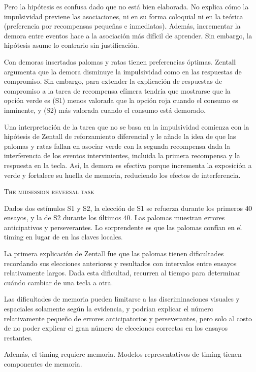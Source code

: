 \documentclass[a4paper,12pt]{article}
\begin{document}
Pero la hipótesis es confusa dado que no está bien elaborada. No explica cómo la impulsividad previene las asociaciones, ni en su forma coloquial ni en la teórica (preferencia por recompensas pequeñas e inmediatas). Además, incrementar la demora entre eventos hace a la asociación más difícil de aprender. Sin embargo, la hipótesis asume lo contrario sin justificación. 

Con demoras insertadas palomas y ratas tienen preferencias óptimas. Zentall argumenta que la demora disminuye la impulsividad como en las respuestas de compromiso. Sin embargo, para extender la explicación de respuestas de compromiso a la tarea de recompensa efímera tendría que mostrarse que la opción verde es (S1) menos valorada que la opción roja cuando el consumo es inminente, y (S2) más valorada cuando el consumo está demorado.

Una interpretación de la tarea que no se basa en la impulsividad comienza con la hipótesis de Zentall de reforzamiento diferencial y le añade la idea de que las palomas y ratas fallan en asociar verde con la segunda recompensa dada la interferencia de los eventos intervinientes, incluida la primera recompensa y la respuesta en la tecla. Así, la demora es efectiva porque incrementa la exposición a verde y fortalece su huella de memoria, reduciendo los efectos de interferencia. 

{\scshape The midsession reversal task}

Dados dos estímulos S1 y S2, la elección de S1 se refuerza durante los primeros 40 ensayos, y la de S2 durante los últimos 40. Las palomas muestran errores anticipativos y perseverantes. Lo sorprendente es que las palomas confían en el timing en lugar de en las claves locales.

La primera explicación de Zentall fue que las palomas tienen dificultades recordando sus elecciones anteriores y resultados con intervalos entre ensayos relativamente largos. Dada esta dificultad, recurren al tiempo para determinar cuándo cambiar de una tecla a otra. 

Las dificultades de memoria pueden limitarse a las discriminaciones visuales y espaciales solamente según la evidencia, y podrían explicar el número relativamente pequeño de errores anticipatorios y perseverantes, pero solo al costo de no poder explicar el gran número de elecciones correctas en los ensayos restantes.

Además, el timing requiere memoria. Modelos representativos de timing tienen componentes de memoria.
\end{document}
